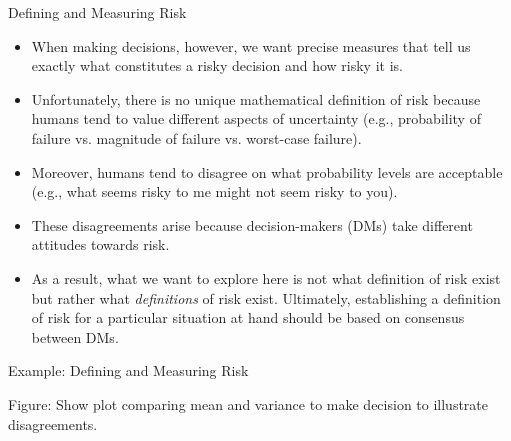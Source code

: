 \documentclass[9pt]{beamer}
\begin{document}
%
\begin{frame}{Defining and Measuring Risk}

\begin{itemize}

\item When making decisions, however, we want precise measures that tell us exactly what constitutes a risky decision and how risky it is. 

\item Unfortunately, there is no unique mathematical definition of risk because humans tend to value different aspects of  uncertainty (e.g., probability of failure vs. magnitude of failure vs. worst-case failure).  

\item Moreover, humans tend to disagree on what probability levels are acceptable (e.g., what seems risky to me might not seem risky to you).

\item These disagreements arise because decision-makers (DMs) take different attitudes towards risk. 

\item As a result, what we want to explore here is not what definition of risk exist but rather what {\em definitions} of risk exist. Ultimately, establishing a definition of risk for a particular situation at hand should be based on consensus between DMs. 

\end{itemize}

\end{frame}

%
\begin{frame}{Example: Defining and Measuring Risk}

\begin{block}{}
Figure: Show plot comparing mean and variance to make decision to illustrate disagreements. 
\end{block}

\end{frame}
\end{document}
